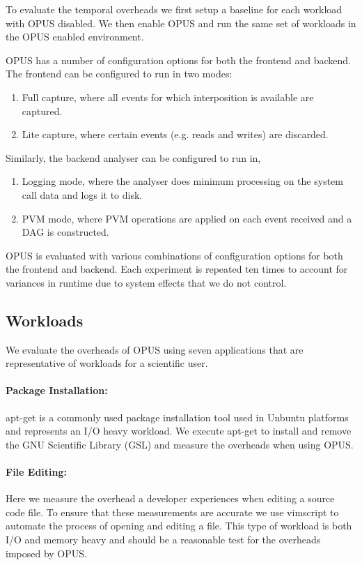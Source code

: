 \documentclass[withindex,glossary]{cam-thesis}
\begin{document}
To evaluate the temporal overheads we first setup a baseline for each workload with OPUS disabled.
We then enable OPUS and run the same set of workloads in the OPUS enabled environment.

OPUS has a number of configuration options for both the frontend and backend.
The frontend can be configured to run in two modes:
\begin{enumerate}
\item Full capture, where all events for which interposition is available are captured.
\item Lite capture, where certain events (e.g. reads and writes) are discarded.
\end{enumerate}

Similarly, the backend analyser can be configured to run in,
\begin{enumerate}
\item Logging mode, where the analyser does minimum processing on the system call data and logs it to disk.
\item PVM mode, where PVM operations are applied on each event received and a DAG is constructed.
\end{enumerate}

OPUS is evaluated with various combinations of configuration options for both the frontend and backend.
Each experiment is repeated ten times to account for variances in runtime due to system effects that we do not control.

\subsection{Workloads}
We evaluate the overheads of OPUS using seven applications that are representative of workloads for a scientific user.

\paragraph{Package Installation:} apt-get is a commonly used package installation tool used in Unbuntu platforms and represents an I/O heavy workload.
We execute apt-get to install and remove the GNU Scientific Library (GSL) and measure the overheads when using OPUS.

\paragraph{File Editing:} Here we measure the overhead a developer experiences when editing a source code file.
To ensure that these measurements are accurate we use vimscript to automate the process of opening and editing a file.
This type of workload is both I/O and memory heavy and should be a reasonable test for the overheads imposed by OPUS.
\end{document}
